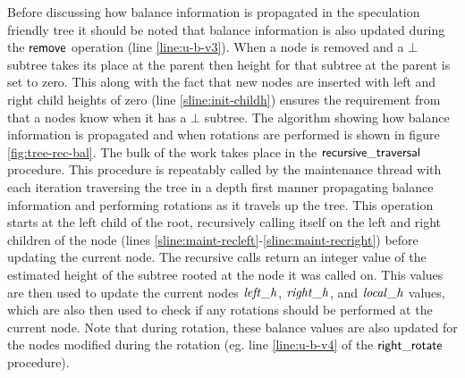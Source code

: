 Before discussing how balance information is propagated in the speculation friendly tree
it should be noted that balance information is also updated during the $\act{remove}$ operation
(line \ref{line:u-b-v3}).
When a node is removed and a $\bot$ subtree takes its place at the parent then height
for that subtree at the parent is set to zero.
This along with the fact that new nodes are inserted with left and right child heights of zero (line \ref{sline:init-childh})
ensures the requirement from \cite{IRISAppr} that a nodes know when it has a $\bot$ subtree.
The algorithm showing how balance information is propagated and when rotations are performed
is shown in figure \ref{fig:tree-rec-bal}.
The bulk of the work takes place in the $\act{recursive\_traversal}$ procedure.
This procedure is repeatably called by the maintenance thread with each iteration traversing
the tree in a depth first manner propagating balance information and performing rotations
as it travels up the tree.
This operation starts at the left child of the root, recursively calling itself on the left
and right children of the node (lines \ref{sline:maint-recleft}-\ref{sline:maint-recright}) before updating the current node.
The recursive calls return an integer value of the estimated height of the subtree rooted
at the node it was called on.
This values are then used to update the current nodes $\ms{left\_h}$, $\ms{right\_h}$, and $\ms{local\_h}$
values, which are also then used to check if any rotations should be performed at the current node.
Note that during rotation, these balance values are also updated for the nodes modified during the rotation
(eg. line \ref{line:u-b-v4} of the $\act{right\_rotate}$ procedure).

